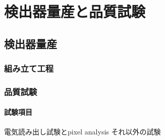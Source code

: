 \chapter{検出器量産と品質試験}

\section{検出器量産}
\subsection{組み立て工程}
\subsection{品質試験}
\subsubsection{試験項目}
電気読み出し試験とpixel analysis
それ以外の試験


